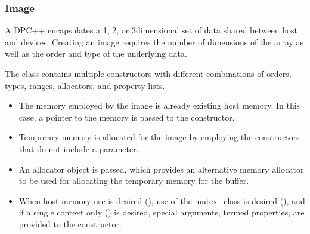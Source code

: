 \documentclass[letterpaper,10pt,english]{sphinxmanual}
\begin{document}
\subsubsection{Image}
\label{\detokenize{programming-interface/data/image:image}}\label{\detokenize{programming-interface/data/image:id1}}\label{\detokenize{programming-interface/data/image::doc}}
A DPC++  encapsulates a 1\sphinxhyphen{}, 2\sphinxhyphen{}, or 3\sphinxhyphen{}dimensional set of data
shared between host and devices. Creating an image requires the number
of dimensions of the array as well as the order and type of the
underlying data.

The class contains multiple constructors with different combinations of
orders, types, ranges, allocators, and property lists.
\begin{itemize}
\item {} 
The memory employed by the image is already existing host memory. In
this case, a pointer to the memory is passed to the constructor.

\item {} 
Temporary memory is allocated for the image by employing the
constructors that do not include a  parameter.

\item {} 
An allocator object is passed, which provides an alternative memory
allocator to be used for allocating the temporary memory for the
buffer.

\item {} 
When host memory use is desired (), use of the
mutex\_class is desired (), and if a single context only
() is desired, special arguments, termed properties,
are provided to the constructor.

\end{itemize}
\end{document}
